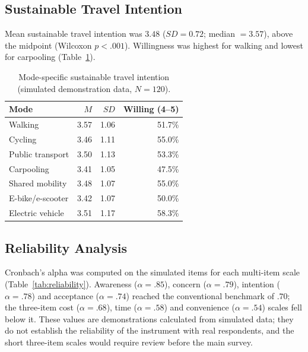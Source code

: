 \documentclass[11pt,a4paper]{article}
\begin{document}
\subsection{Sustainable Travel Intention}
Mean sustainable travel intention was $3.48$ ($SD = 0.72$; median $= 3.57$), above the midpoint
(Wilcoxon $p < .001$). Willingness was highest for walking and lowest for carpooling
(Table~\ref{tab:intention}).

\begin{table}[H]
\centering
\small
\caption{Mode-specific sustainable travel intention (simulated demonstration data, $N = 120$).}
\label{tab:intention}
\begin{tabular}{@{}lrrr@{}}
\toprule
\textbf{Mode} & \textbf{$M$} & \textbf{$SD$} & \textbf{Willing (4--5)}\\
\midrule
Walking & 3.57 & 1.06 & 51.7\%\\
Cycling & 3.46 & 1.11 & 55.0\%\\
Public transport & 3.50 & 1.13 & 53.3\%\\
Carpooling & 3.41 & 1.05 & 47.5\%\\
Shared mobility & 3.48 & 1.07 & 55.0\%\\
E-bike/e-scooter & 3.42 & 1.07 & 50.0\%\\
Electric vehicle & 3.51 & 1.17 & 58.3\%\\
\bottomrule
\end{tabular}
\end{table}

\subsection{Reliability Analysis}
Cronbach's alpha was computed on the simulated items for each multi-item scale
(Table~\ref{tab:reliability}). Awareness ($\alpha = .85$), concern ($\alpha = .79$), intention
($\alpha = .78$) and acceptance ($\alpha = .74$) reached the conventional benchmark of $.70$; the
three-item cost ($\alpha = .68$), time ($\alpha = .58$) and convenience ($\alpha = .54$) scales fell
below it. These values are demonstrations calculated from simulated data; they do not establish the
reliability of the instrument with real respondents, and the short three-item scales would require
review before the main survey.
\end{document}
